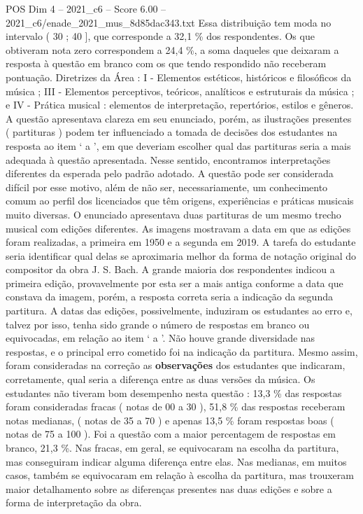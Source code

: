 \begin{textsample}{POS Dim 4 – 2021\_c6 – Score 6.00 – 2021\_c6/enade\_2021\_mus\_8d85dac343.txt}
Essa distribuição tem moda no intervalo ( 30 ; 40 ], que corresponde a 32,1 \% dos respondentes.
Os que obtiveram nota zero correspondem a 24,4 \%, a soma daqueles que deixaram a resposta à questão em branco com os que tendo respondido não receberam pontuação.
Diretrizes da Área : I - Elementos estéticos, históricos e filosóficos da música ; III - Elementos perceptivos, teóricos, analíticos e estruturais da música ; e IV - Prática musical : elementos de interpretação, repertórios, estilos e gêneros.
A questão apresentava clareza em seu enunciado, porém, as ilustrações presentes ( partituras ) podem ter influenciado a tomada de decisões dos estudantes na resposta ao item ‘ a ’, em que deveriam escolher qual das partituras seria a mais adequada à questão apresentada.
Nesse sentido, encontramos interpretações diferentes da esperada pelo padrão adotado.
A questão pode ser considerada difícil por esse motivo, além de não ser, necessariamente, um conhecimento comum ao perfil dos licenciados que têm origens, experiências e práticas musicais muito diversas.
O enunciado apresentava duas partituras de um mesmo trecho musical com edições diferentes.
As imagens mostravam a data em que as edições foram realizadas, a primeira em 1950 e a segunda em 2019.
A tarefa do estudante seria identificar qual delas se aproximaria melhor da forma de notação original do compositor da obra J.
S.
Bach.
A grande maioria dos respondentes indicou a primeira edição, provavelmente por esta ser a mais antiga conforme a data que constava da imagem, porém, a resposta correta seria a indicação da segunda partitura.
A datas das edições, possivelmente, induziram os estudantes ao erro e, talvez por isso, tenha sido grande o número de respostas em branco ou equivocadas, em relação ao item ‘ a ’.
Não houve grande diversidade nas respostas, e o principal erro cometido foi na indicação da partitura.
Mesmo assim, foram consideradas na correção as \textbf{observações} dos estudantes que indicaram, corretamente, qual seria a diferença entre as duas versões da música.
Os estudantes não tiveram bom desempenho nesta questão : 13,3 \% das respostas foram consideradas fracas ( notas de 00 a 30 ), 51,8 \% das respostas receberam notas medianas, ( notas de 35 a 70 ) e apenas 13,5 \% foram respostas boas ( notas de 75 a 100 ).
Foi a questão com a maior percentagem de respostas em branco, 21,3 \%.
Nas fracas, em geral, se equivocaram na escolha da partitura, mas conseguiram indicar alguma diferença entre elas.
Nas medianas, em muitos casos, também se equivocaram em relação à escolha da partitura, mas trouxeram maior detalhamento sobre as diferenças presentes nas duas edições e sobre a forma de interpretação da obra.

\end{textsample}
